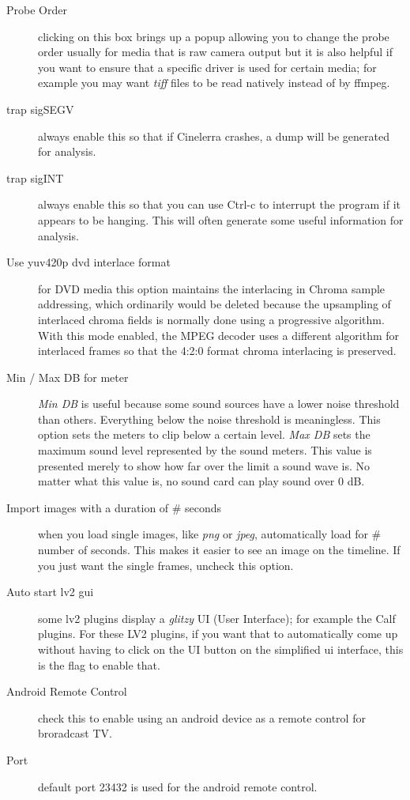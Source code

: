 \begin{description}
    \item[Probe Order] clicking on this box brings up a popup allowing you to change the probe order usually for media that is raw camera output but it is also helpful if you want to ensure that a specific driver is used for certain media; for example you may want \textit{tiff} files to be read natively instead of by ffmpeg.
    \item[trap sigSEGV] always enable this so that if Cinelerra crashes, a dump will be generated for analysis.
    \item[trap sigINT] always enable this so that you can use Ctrl-c to interrupt the program if it appears to be hanging.  This will often generate some useful information for analysis.
    \item[Use yuv420p dvd interlace format] for DVD media this option maintains the interlacing in Chroma sample addressing, which ordinarily would be deleted because the upsampling of interlaced chroma fields is normally done using a progressive algorithm.  With this mode enabled, the MPEG decoder uses a different algorithm for interlaced frames so that the 4:2:0 format chroma interlacing is preserved.
    \item[Min / Max DB for meter] \textit{Min DB} is useful because some sound sources have a lower noise threshold than others. Everything below the noise threshold is meaningless. This option sets the meters to clip below a certain level.  \textit{Max DB} sets the maximum sound level represented by the sound meters. This value is presented merely to show how far over the limit a sound wave is. No matter what this value is, no sound card can play sound over 0 dB.
    \item[Import images with a duration of \# seconds] when you load single images, like \textit{png} or \textit{jpeg}, automatically load for \# number of seconds.  This makes it easier to see an image on the timeline.  If you just want the single frames, uncheck this option.
    \item[Auto start lv2 gui] some lv2 plugins display a \textit{glitzy} UI (User Interface); for example the Calf plugins.  For these LV2 plugins, if you want that to automatically come up without having to click on the UI button on the simplified ui interface, this is the flag to enable that.
    \item[Android Remote Control] check this to enable using an android device as a remote control for broradcast TV.
    \item[Port] default port 23432 is used for the android remote control.

\end{description}
